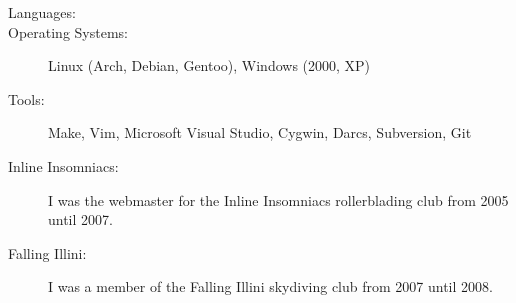 \documentclass[letterpaper,10pt]{article}
\begin{document}
\begin{itemize}
\end{itemize}
\begin{description}
\item[Languages:]
\begin{minipage}[t]{6.5in}
\end{minipage}
\item[Operating Systems:] Linux (Arch, Debian, Gentoo), Windows (2000, XP)
\item[Tools:] Make, Vim, Microsoft Visual Studio, Cygwin, Darcs, Subversion, Git
\end{description}
\begin{description}
\item[Inline Insomniacs:] I was the webmaster for the Inline Insomniacs rollerblading club from 2005 until 2007.
\item[Falling Illini:] I was a member of the Falling Illini skydiving club from 2007 until 2008.
\end{description}
\end{document}
